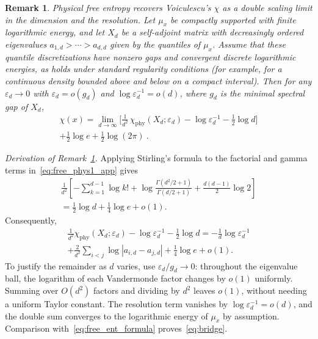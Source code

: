 \documentclass[aps,prl,twocolumn,superscriptaddress,amsmath,amssymb,reprint,longbibliography]{revtex4-2}
\newtheorem{rem}{Remark}
\def\eps{\varepsilon}
\begin{document}
\begin{rem}\label{rem:bridge}
Physical free entropy recovers Voiculescu's $\chi$ as a double scaling limit in the dimension and the resolution. Let $\mu_x$ be compactly supported with finite logarithmic energy, and let $X_d$ be a self-adjoint matrix with decreasingly ordered eigenvalues $a_{1,d}>\cdots>a_{d,d}$ given by the quantiles of $\mu_x$. Assume that these quantile discretizations have nonzero gaps and convergent discrete logarithmic energies, as holds under standard regularity conditions (for example, for a continuous density bounded above and below on a compact interval). Then for any $\eps_d\to0$ with $\eps_d=o(g_d)$ and $\log\eps_d^{-1}=o(d)$, where $g_d$ is the minimal spectral gap of $X_d$,
\begin{multline}\label{eq:bridge}
\chi(x)=\lim_{d\to\infty}\Big[
\tfrac{1}{d^{2}}\,\chi_{\mathrm{phy}}(X_d;\eps_{d})
-\log\eps_{d}^{-1}-\tfrac12\log d\Big]\\
+\tfrac12\log e+\tfrac12\log(2\pi)\ .
\end{multline}
\end{rem}

\emph{Derivation of Remark~\ref{rem:bridge}.} Applying Stirling's formula to the factorial and gamma terms in~\eqref{eq:free_phys1_app} gives
\begin{multline}
\frac1{d^2}\left[-\sum_{k=1}^{d-1}\log k!
+\log\frac{\Gamma(d^2/2+1)}{\Gamma(d/2+1)}
+\frac{d(d-1)}2\log2\right]\\
=\frac12\log d+\frac14\log e+o(1).
\end{multline}
Consequently,
\begin{multline}
\frac1{d^2}\chi_\mathrm{phy}(X_d;\eps_d)
-\log\eps_d^{-1}-\frac12\log d
=-\frac1d\log\eps_d^{-1}\\
+\frac2{d^2}\sum_{i<j}\log|a_{i,d}-a_{j,d}|
+\frac14\log e+o(1).
\end{multline}
To justify the remainder as $d$ varies, use $\eps_d/g_d\to0$: throughout the eigenvalue ball, the logarithm of each Vandermonde factor changes by $o(1)$ uniformly. Summing over $O(d^2)$ factors and dividing by $d^2$ leaves $o(1)$, without needing a uniform Taylor constant. The resolution term vanishes by $\log\eps_d^{-1}=o(d)$, and the double sum converges to the logarithmic energy of $\mu_x$ by assumption. Comparison with~\eqref{eq:free_ent_formula} proves~\eqref{eq:bridge}.
\end{document}

